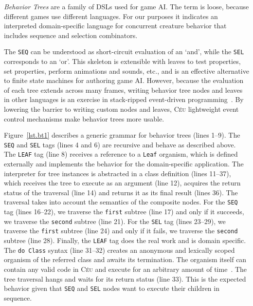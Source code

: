 \documentclass{sig-alternate}
\newcommand{\CEU}{\textsc{C\'{e}u}\xspace}
\newcommand{\code}[1] {{\small{\texttt{#1}}}}
\begin{document}
\emph{Behavior Trees} are a family of DSLs used for game AI.
The term is loose, because different games use different languages.
For our purposes it indicates an interpreted domain-specific language
for concurrent creature behavior that includes sequence and selection combinators.

The \code{SEQ} can be understood as short-circuit evaluation of an `and',
while the \code{SEL} corresponds to an `or'.
This skeleton is extensible with leaves to test properties, set properties, 
perform animations and sounds, etc., and is an effective alternative to finite 
state machines for authoring game AI.
%
However, because the evaluation of each tree extends across many frames, 
writing behavior tree nodes and leaves in other languages is an exercise in 
stack-ripped event-driven programming~\cite{krohn2007events}.
%
%
By lowering the barrier to writing custom nodes and leaves, \CEU lightweight 
event control mechanisms make behavior trees more usable.

Figure~\ref{lst.bt1} describes a generic grammar for behavior trees (lines 
1--9).
The \code{SEQ} and \code{SEL} tags (lines 4 and 6) are recursive and behave as 
described above.
The \code{LEAF} tag (line 8) receives a reference to a \code{Leaf} organism, 
which is defined externally and implements the behavior for the domain-specific 
application.
%
The interpreter for tree instances is abstracted in a class definition (lines 
11--37), which receives the tree to execute as an argument (line 12), acquires 
the return status of the traversal (line 14) and returns it as its final result 
(lines 36).
%
The traversal takes into account the semantics of the composite nodes.
%
For the \code{SEQ} tag (lines 16--22), we traverse the \code{first} subtree 
(line 17) and only if it succeeds, we traverse the \code{second} subtree (line 
21).
%
For the \code{SEL} tag (lines 23--29), we traverse the \code{first} subtree 
(line 24) and only if it fails, we traverse the \code{second} subtree (line 
28).
%
Finally, the \code{LEAF} tag does the real work and is domain specific.
The \code{do Class} syntax (line 31--32) creates an anonymous and lexically 
scoped organism of the referred class and awaits its termination.
The organism itself can contain any valid code in \CEU and execute for an 
arbitrary amount of time~\cite{ceu.mod15}.
The tree traversal hangs and waits for its return status (line 33).
This is the expected behavior given that \code{SEQ} and \code{SEL} nodes want 
to execute their children in sequence.
\end{document}
